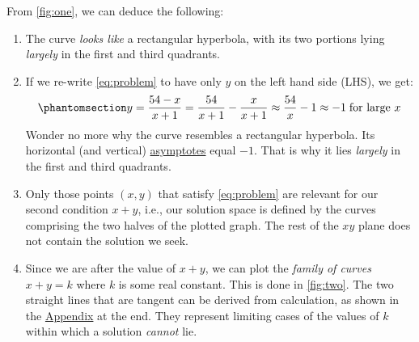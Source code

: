 \documentclass[
  a4paper,
]{article}
\begin{document}
From \cref{fig:one}, we can deduce the following:

\begin{enumerate}
\def\labelenumi{(\alph{enumi})}
\item
  The curve \emph{looks like} a rectangular hyperbola, with its two
  portions lying \emph{largely} in the first and third quadrants.
\item
  If we re-write \cref{eq:problem} to have only \(y\) on the left hand
  side (LHS), we get:
  \begin{equation}\phantomsection\label{eq:hyperbola}{
  y = \frac{54-x}{x+1} = \frac{54}{x+1} -\frac{x}{x+1} \approx \frac{54}{x} - 1 \approx -1 \; \mbox{for large $x$}
  }\end{equation} Wonder no more why the curve resembles a rectangular
  hyperbola. Its horizontal (and vertical)
  \href{https://en.wikipedia.org/wiki/Asymptote}{asymptotes} equal
  \(-1\). That is why it lies \emph{largely} in the first and third
  quadrants.
\item
  Only those points \((x, y)\) that satisfy \cref{eq:problem} are
  relevant for our second condition \(x + y\), i.e., our solution space
  is defined by the curves comprising the two halves of the plotted
  graph. The rest of the \(xy\) plane does not contain the solution we
  seek.
\item
  Since we are after the value of \(x + y\), we can plot the
  \emph{family of curves} \(x + y = k\) where \(k\) is some real
  constant. This is done in \cref{fig:two}. The two straight lines that
  are tangent can be derived from calculation, as shown in the
  \hyperref[appendix]{Appendix} at the end. They represent limiting
  cases of the values of \(k\) within which a solution \emph{cannot}
  lie.
\end{enumerate}
\end{document}
